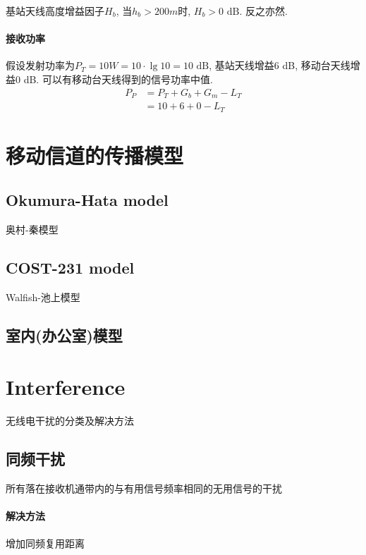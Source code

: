 \documentclass[a4paper]{report}
\begin{document}
 基站天线高度增益因子$H_b$, 当$h_b>200m$时, $H_b>0\text{ dB}$. 反之亦然. 

 \paragraph{接收功率}假设发射功率为$P_T=10W=10\cdot \lg{10}=10\text{ dB}$, 基站天线增益6 dB, 移动台天线增益0 dB. 可以有移动台天线得到的信号功率中值. 
 \begin{align*}
	 P_P&=P_T+G_b+G_m-L_T \\
	 &=10+6+0-L_T
 \end{align*}
\section{移动信道的传播模型}
 \subsection{Okumura-Hata model}
 奥村-秦模型
 \subsection{COST-231 model}
 Walfish-池上模型
 \subsection{室内(办公室)模型}


 \section{Interference}
 无线电干扰的分类及解决方法
 \subsection{同频干扰}所有落在接收机通带内的与有用信号频率相同的无用信号的干扰
\paragraph{解决方法}增加同频复用距离
\end{document}
